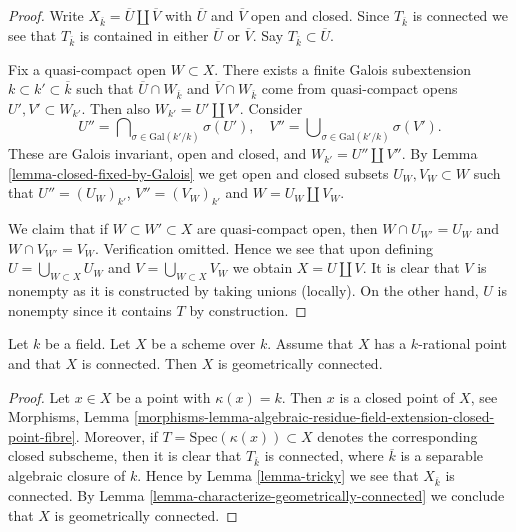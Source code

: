 \begin{proof}
Write $X_{\overline{k}} = \overline{U} \coprod \overline{V}$
with $\overline{U}$ and $\overline{V}$ open and closed.
Since $T_{\overline{k}}$ is connected we see that
$T_{\overline{k}}$ is contained in either $\overline{U}$ or $\overline{V}$.
Say $T_{\overline{k}} \subset \overline{U}$.

\medskip\noindent
Fix a quasi-compact open $W \subset X$. There exists a
finite Galois subextension $k \subset k' \subset \overline{k}$
such that $\overline{U} \cap W_{\overline{k}}$ and
$\overline{V} \cap W_{\overline{k}}$ come from quasi-compact
opens $U', V' \subset W_{k'}$. Then also $W_{k'} = U' \coprod V'$.
Consider
$$
U'' = \bigcap\nolimits_{\sigma \in \text{Gal}(k'/k)} \sigma(U'),
\quad
V'' = \bigcup\nolimits_{\sigma \in \text{Gal}(k'/k)} \sigma(V').
$$
These are Galois invariant, open and closed, and
$W_{k'} = U'' \coprod V''$.
By Lemma \ref{lemma-closed-fixed-by-Galois} we get open and closed subsets
$U_W, V_W \subset W$ such that
$U'' = (U_W)_{k'}$, $V'' = (V_W)_{k'}$ and
$W = U_W \coprod V_W$.

\medskip\noindent
We claim that if $W \subset W' \subset X$ are quasi-compact
open, then $W \cap U_{W'} = U_W$ and $W \cap V_{W'} = V_W$.
Verification omitted.
Hence we see that upon defining $U = \bigcup_{W \subset X} U_W$
and $V = \bigcup_{W \subset X} V_W$ we obtain $X = U \coprod V$.
It is clear that $V$ is nonempty as it is constructed by taking
unions (locally). On the other hand, $U$ is nonempty since it contains
$T$ by construction.
\end{proof}

\begin{lemma}
\label{lemma-geometrically-connected-if-connected-and-point}
Let $k$ be a field. Let $X$ be a scheme over $k$.
Assume that $X$ has a $k$-rational point and that $X$ is connected.
Then $X$ is geometrically connected.
\end{lemma}

\begin{proof}
Let $x \in X$ be a point with $\kappa(x) = k$. Then $x$ is a
closed point of $X$, see
Morphisms, Lemma
\ref{morphisms-lemma-algebraic-residue-field-extension-closed-point-fibre}.
Moreover, if $T = \text{Spec}(\kappa(x)) \subset X$ denotes the corresponding
closed subscheme, then it is clear that $T_{\overline{k}}$ is connected, where
$\overline{k}$ is a separable algebraic closure of $k$. Hence by
Lemma \ref{lemma-tricky}
we see that $X_{\overline{k}}$ is connected. By
Lemma \ref{lemma-characterize-geometrically-connected}
we conclude that $X$ is geometrically connected.
\end{proof}

